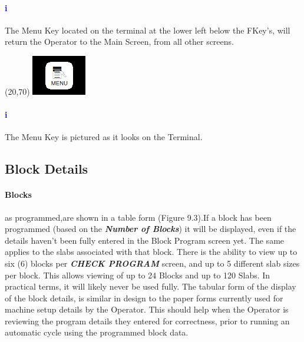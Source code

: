 \paragraph{\textbf{\LARGE \textcolor{blue}{i}}}
The Menu Key located on the terminal at the lower left below the FKey's, will return the Operator to the Main Screen, from all other screens.\\
\begin{minipage}{4cm}
	\begin{picture}(20,70)
		\includegraphics[width=.5\linewidth]{screen-captures/menu}
	\end{picture}
\end{minipage}\begin{minipage}[]{11cm}
	\paragraph{\textbf{\LARGE \textcolor{blue}{i}}} The Menu Key is pictured as it looks on the Terminal.
\end{minipage}
\pagebreak
\subsection{Block Details}\paragraph*{Blocks}as programmed,are shown in a table form (Figure 9.3).If a block has been programmed (based on the \textbf{\textit{Number of Blocks}}) it will be displayed, even if the details haven't been fully entered in the Block Program screen yet. The same applies to the slabs associated with that block. There is the ability to view up to six (6) blocks per \textbf{\textit{CHECK PROGRAM}} screen, and up to 5 different slab sizes per block. This allows viewing of up to 24 Blocks and up to 120 Slabs. In practical terms, it will likely never be used fully. The tabular form of the display of the block details, is similar in design to the paper forms currently used for machine setup details by the Operator. This should help when the Operator is reviewing the program details they entered for correctness, prior to running an automatic cycle using the programmed block data.

